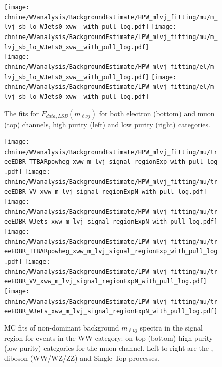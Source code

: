 
\begin{figure}[htbp]
\centering
\texttt{[image: \\chnine/WVanalysis/BackgroundEstimate/HPW\_mlvj\_fitting/mu/m\_lvj\_sb\_lo\_WJets0\_xww\_\_with\_pull\_log.pdf]}
\texttt{[image: \\chnine/WVanalysis/BackgroundEstimate/LPW\_mlvj\_fitting/mu/m\_lvj\_sb\_lo\_WJets0\_xww\_\_with\_pull\_log.pdf]}\\
\texttt{[image: \\chnine/WVanalysis/BackgroundEstimate/HPW\_mlvj\_fitting/el/m\_lvj\_sb\_lo\_WJets0\_xww\_\_with\_pull\_log.pdf]}
\texttt{[image: \\chnine/WVanalysis/BackgroundEstimate/LPW\_mlvj\_fitting/el/m\_lvj\_sb\_lo\_WJets0\_xww\_\_with\_pull\_log.pdf]}\\
\caption{The fits for $F_{data,LSB}(m_{\ell\nu j})$ for both electron (bottom) and muon (top) channels, high purity (left) and low purity (right) categories.}
\label{fig:sbfitmlvj_data}
\end{figure}


\begin{figure}[htbp]
\centering
\texttt{[image: \\chnine/WVanalysis/BackgroundEstimate/HPW\_mlvj\_fitting/mu/treeEDBR\_TTBARpowheg\_xww\_m\_lvj\_signal\_regionExp\_with\_pull\_log.pdf]}
\texttt{[image: \\chnine/WVanalysis/BackgroundEstimate/HPW\_mlvj\_fitting/mu/treeEDBR\_VV\_xww\_m\_lvj\_signal\_regionExpN\_with\_pull\_log.pdf]}
\texttt{[image: \\chnine/WVanalysis/BackgroundEstimate/HPW\_mlvj\_fitting/mu/treeEDBR\_WJets\_xww\_m\_lvj\_signal\_regionExpN\_with\_pull\_log.pdf]}\\
\texttt{[image: \\chnine/WVanalysis/BackgroundEstimate/LPW\_mlvj\_fitting/mu/treeEDBR\_TTBARpowheg\_xww\_m\_lvj\_signal\_regionExp\_with\_pull\_log.pdf]}
\texttt{[image: \\chnine/WVanalysis/BackgroundEstimate/LPW\_mlvj\_fitting/mu/treeEDBR\_VV\_xww\_m\_lvj\_signal\_regionExpN\_with\_pull\_log.pdf]}
\texttt{[image: \\chnine/WVanalysis/BackgroundEstimate/LPW\_mlvj\_fitting/mu/treeEDBR\_WJets\_xww\_m\_lvj\_signal\_regionExpN\_with\_pull\_log.pdf]}\\
\caption{MC fits of non-dominant background $m_{\ell\nu j}$ spectra in the \mJ signal region for events in the WW category: on top (bottom) high purity (low purity) categories for the muon channel. Left to right are the \ttbar, diboson (WW/WZ/ZZ) and Single Top processes.}
\label{fig:srWfitmlvj_1}
\end{figure}

